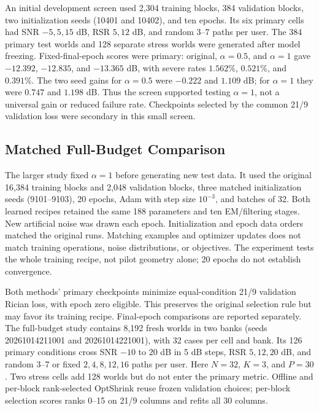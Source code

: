 An initial development screen used 2,304 training blocks, 384 validation
blocks, two initialization seeds (10401 and 10402), and ten epochs. Its
six primary cells had SNR $-5,5,15$ dB, RSR $5,12$ dB, and random
3--7 paths per user. The 384 primary test worlds and 128 separate stress
worlds were generated after model freezing. Fixed-final-epoch scores
were primary: original, $\alpha=0.5$, and $\alpha=1$ gave
$-12.392$, $-12.835$, and $-13.365$ dB, with severe rates
$1.562\%$, $0.521\%$, and $0.391\%$. The two seed gains for
$\alpha=0.5$ were $-0.222$ and $1.109$ dB; for $\alpha=1$ they were
$0.747$ and $1.198$ dB. Thus the screen supported testing $\alpha=1$,
not a universal gain or reduced failure rate. Checkpoints selected by
the common 21/9 validation loss were secondary in this small screen.

\subsection{Matched Full-Budget Comparison}

The larger study fixed $\alpha=1$ before generating new test data. It
used the original 16,384 training blocks and 2,048 validation blocks,
three matched initialization seeds (9101--9103), 20 epochs, Adam with
step size $10^{-3}$, and batches of 32. Both learned recipes retained the same
188 parameters and ten EM/filtering stages. New artificial noise was
drawn each epoch. Initialization and epoch data orders matched the
original runs. Matching examples and optimizer updates does not match
training operations, noise distributions, or objectives. The experiment
tests the whole training recipe, not pilot geometry alone; 20 epochs
do not establish convergence.

Both methods' primary checkpoints minimize equal-condition 21/9
validation Rician loss, with epoch zero eligible. This preserves the
original selection rule but may favor its training recipe. Final-epoch
comparisons are reported separately. The full-budget study contains
8,192 fresh worlds in two banks (seeds 20261014211001 and
20261014221001), with 32 cases per cell and bank. Its 126 primary
conditions cross SNR $-10$ to $20$ dB in 5 dB steps, RSR $5,12,20$ dB,
and random 3--7 or fixed $2,4,8,12,16$ paths per user. Here
$N=32$, $K=3$, and $P=30$. Two stress cells add 128 worlds but do not
enter the primary metric. Offline and per-block rank-selected OptShrink
reuse frozen validation choices; per-block selection scores ranks
0--15 on 21/9 columns and refits all 30 columns.

